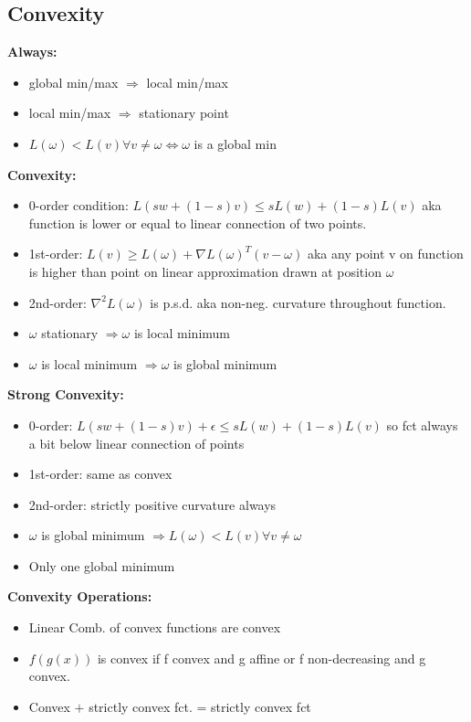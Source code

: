\subsection{Convexity}

\textbf{Always:}
\begin{itemize}
    \item global min/max $\Rightarrow$ local min/max
    \item local min/max $\Rightarrow$ stationary point
    \item $L(\omega) < L(v) \forall v\neq \omega \Leftrightarrow \omega$ is a global min
\end{itemize}
\textbf{Convexity:}
\begin{itemize}
    \item 0-order condition: $L(sw + (1-s)v) \leq sL(w) + (1-s)L(v)$
    aka function is lower or equal to linear connection of two points.
    \item 1st-order: $L(v) \geq L(\omega) + \nabla L(\omega)^T(v-\omega)$ aka any point v on function is higher than point on linear approximation drawn at position $\omega$
    \item 2nd-order: $\nabla^2 L(\omega)$ is p.s.d. aka non-neg. curvature throughout function.
    \item $\omega$ stationary $\Rightarrow \omega$ is local minimum 
    \item $\omega$ is local minimum $\Rightarrow \omega$ is global minimum
\end{itemize}
\textbf{Strong Convexity:}
\begin{itemize}
    \item 0-order: $L(sw + (1-s)v) + \epsilon \leq sL(w) + (1-s)L(v)$ so fct always a bit below linear connection of points
    \item 1st-order: same as convex
    \item 2nd-order: strictly positive curvature always
    \item $\omega$ is global minimum $\Rightarrow L(\omega) < L(v) \forall v\neq \omega$ 
    \item Only one global minimum
\end{itemize}
\textbf{Convexity Operations:}
\begin{itemize}
    \item Linear Comb. of convex functions are convex
    \item $f(g(x))$ is convex if f convex and g affine or f non-decreasing and g convex.
    \item Convex $+$ strictly convex fct. = strictly convex fct
\end{itemize}